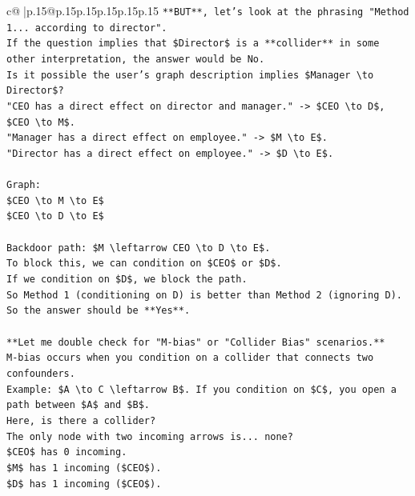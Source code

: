 \documentclass{article}
\begin{document}
{\begin{supertabular}{c@{$\;$}|p{.15\linewidth}@{}p{.15\linewidth}p{.15\linewidth}p{.15\linewidth}p{.15\linewidth}p{.15\linewidth}}
{{{\texttt{**BUT**, let's look at the phrasing "Method 1... according to director".} \\
\texttt{If the question implies that \$Director\$ is a **collider** in some other interpretation, the answer would be No.} \\
\texttt{Is it possible the user's graph description implies \$Manager \textbackslash{}to Director\$?} \\
\texttt{"CEO has a direct effect on director and manager." {-}> \$CEO \textbackslash{}to D\$, \$CEO \textbackslash{}to M\$.} \\
\texttt{"Manager has a direct effect on employee." {-}> \$M \textbackslash{}to E\$.} \\
\texttt{"Director has a direct effect on employee." {-}> \$D \textbackslash{}to E\$.} \\
\\ 
\texttt{Graph:} \\
\texttt{\$CEO \textbackslash{}to M \textbackslash{}to E\$} \\
\texttt{\$CEO \textbackslash{}to D \textbackslash{}to E\$} \\
\\ 
\texttt{Backdoor path: \$M \textbackslash{}leftarrow CEO \textbackslash{}to D \textbackslash{}to E\$.} \\
\texttt{To block this, we can condition on \$CEO\$ or \$D\$.} \\
\texttt{If we condition on \$D\$, we block the path.} \\
\texttt{So Method 1 (conditioning on D) is better than Method 2 (ignoring D).} \\
\texttt{So the answer should be **Yes**.} \\
\\ 
\texttt{**Let me double check for "M{-}bias" or "Collider Bias" scenarios.**} \\
\texttt{M{-}bias occurs when you condition on a collider that connects two confounders.} \\
\texttt{Example: \$A \textbackslash{}to C \textbackslash{}leftarrow B\$. If you condition on \$C\$, you open a path between \$A\$ and \$B\$.} \\
\texttt{Here, is there a collider?} \\
\texttt{The only node with two incoming arrows is... none?} \\
\texttt{\$CEO\$ has 0 incoming.} \\
\texttt{\$M\$ has 1 incoming (\$CEO\$).} \\
\texttt{\$D\$ has 1 incoming (\$CEO\$).} \\
}}}
\end{supertabular}}
\end{document}
